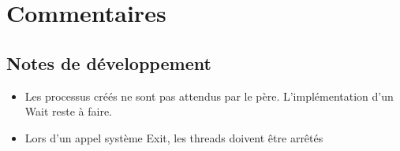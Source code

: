 \documentclass{report}
\begin{document}
\chapter{Commentaires}

\section{Notes de développement}

\begin{itemize}
\item Les processus créés ne sont pas attendus par le père. L'implémentation d'un Wait reste à faire.
\item Lors d'un appel système Exit, les threads doivent être arrêtés
\end{itemize}
\end{document}
